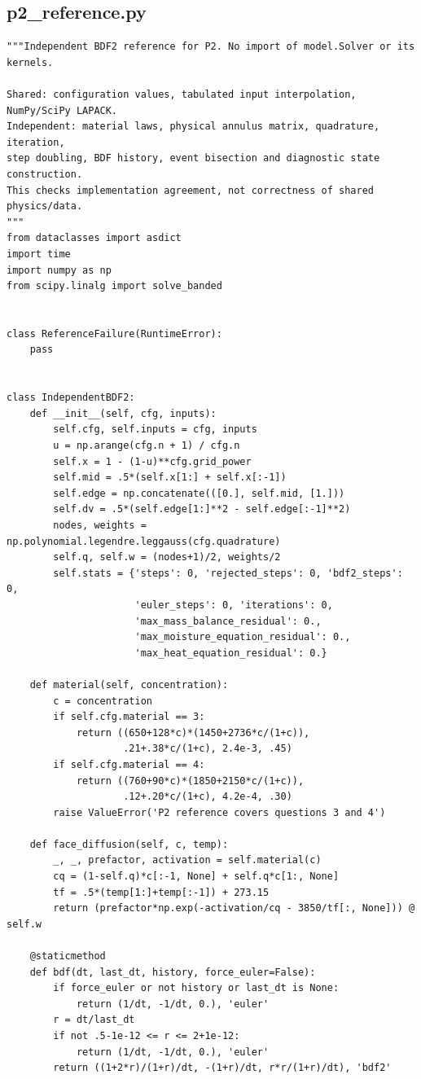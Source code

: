 \subsection{p2\_reference.py}
\begin{verbatim}
"""Independent BDF2 reference for P2. No import of model.Solver or its kernels.

Shared: configuration values, tabulated input interpolation, NumPy/SciPy LAPACK.
Independent: material laws, physical annulus matrix, quadrature, iteration,
step doubling, BDF history, event bisection and diagnostic state construction.
This checks implementation agreement, not correctness of shared physics/data.
"""
from dataclasses import asdict
import time
import numpy as np
from scipy.linalg import solve_banded


class ReferenceFailure(RuntimeError):
    pass


class IndependentBDF2:
    def __init__(self, cfg, inputs):
        self.cfg, self.inputs = cfg, inputs
        u = np.arange(cfg.n + 1) / cfg.n
        self.x = 1 - (1-u)**cfg.grid_power
        self.mid = .5*(self.x[1:] + self.x[:-1])
        self.edge = np.concatenate(([0.], self.mid, [1.]))
        self.dv = .5*(self.edge[1:]**2 - self.edge[:-1]**2)
        nodes, weights = np.polynomial.legendre.leggauss(cfg.quadrature)
        self.q, self.w = (nodes+1)/2, weights/2
        self.stats = {'steps': 0, 'rejected_steps': 0, 'bdf2_steps': 0,
                      'euler_steps': 0, 'iterations': 0,
                      'max_mass_balance_residual': 0.,
                      'max_moisture_equation_residual': 0.,
                      'max_heat_equation_residual': 0.}

    def material(self, concentration):
        c = concentration
        if self.cfg.material == 3:
            return ((650+128*c)*(1450+2736*c/(1+c)),
                    .21+.38*c/(1+c), 2.4e-3, .45)
        if self.cfg.material == 4:
            return ((760+90*c)*(1850+2150*c/(1+c)),
                    .12+.20*c/(1+c), 4.2e-4, .30)
        raise ValueError('P2 reference covers questions 3 and 4')

    def face_diffusion(self, c, temp):
        _, _, prefactor, activation = self.material(c)
        cq = (1-self.q)*c[:-1, None] + self.q*c[1:, None]
        tf = .5*(temp[1:]+temp[:-1]) + 273.15
        return (prefactor*np.exp(-activation/cq - 3850/tf[:, None])) @ self.w

    @staticmethod
    def bdf(dt, last_dt, history, force_euler=False):
        if force_euler or not history or last_dt is None:
            return (1/dt, -1/dt, 0.), 'euler'
        r = dt/last_dt
        if not .5-1e-12 <= r <= 2+1e-12:
            return (1/dt, -1/dt, 0.), 'euler'
        return ((1+2*r)/(1+r)/dt, -(1+r)/dt, r*r/(1+r)/dt), 'bdf2'


\end{verbatim}
